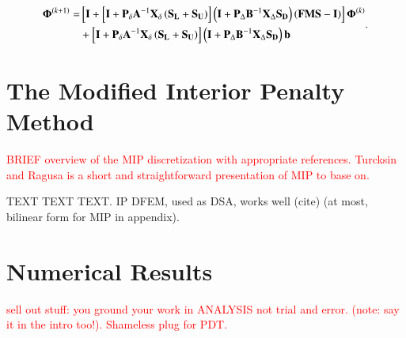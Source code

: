 \documentclass[preprint,10pt]{elsarticle}
\newcommand{\tcr}[1]{\textcolor{red}{#1}}
\begin{document}
\begin{equation}
\label{eq::DSA_MG_Summary_TG_Jac}
\begin{aligned}
{\bf \Phi}^{(k+1)} = & \left[ {\bf I} +\left[ {\bf I}+ {\bf P}_{\delta}{\bf A}^{-1}  {\bf X}_{\delta}\left(   {\bf S_L} +  {\bf S_U} \right) \right]    \left(  {\bf I} + {\bf P}_{\Delta} {\bf B}^{-1} {\bf X}_{\Delta} {\bf S_D} \right) \left(   {\bf F}  {\bf M} {\bf S}  - {\bf I} \right)   \right]{\bf \Phi}^{(k)} \\
&+  \left[ {\bf I}+ {\bf P}_{\delta}{\bf A}^{-1}  {\bf X}_{\delta}\left(   {\bf S_L} +  {\bf S_U} \right) \right]  \left(  {\bf I} + {\bf P}_{\Delta} {\bf B}^{-1} {\bf X}_{\Delta} {\bf S_D} \right) {\bf b} \\
\end{aligned} .
\end{equation}

\section{The Modified Interior Penalty Method} \label{sec::MIP}

\tcr{BRIEF overview of the MIP discretization with appropriate references. Turcksin and Ragusa is a short and straightforward presentation of MIP to base on.}

TEXT TEXT TEXT. IP DFEM, used as DSA, works well (cite) (at most, bilinear form for MIP in appendix).

\section{Numerical Results} \label{sec::results}
\tcr{sell out stuff: you ground your work in ANALYSIS not trial and error. (note: say it in the intro too!). Shameless plug for PDT.}

\end{document}
